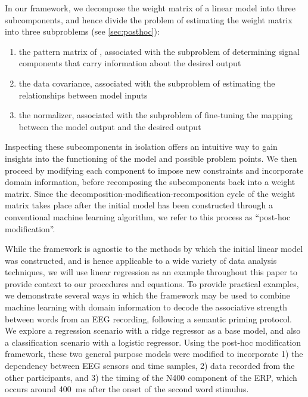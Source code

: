 \documentclass[a4paper]{vanvliet_paper}
\begin{document}
In our framework, we decompose the weight matrix of a linear model into three subcomponents, and hence divide the problem of estimating the weight matrix into three subproblems (see \autoref{sec:posthoc}):
\begin{enumerate}
    \item the pattern matrix of \textcite{Haufe2014}, associated with the subproblem of determining signal components that carry information about the desired output
    \item the data covariance, associated with the subproblem of estimating the relationships between model inputs
    \item the normalizer, associated with the subproblem of fine-tuning the mapping between the model output and the desired output
\end{enumerate}
Inspecting these subcomponents in isolation offers an intuitive way to gain insights into the functioning of the model and possible problem points.
We then proceed by modifying each component to impose new constraints and incorporate domain information, before recomposing the subcomponents back into a weight matrix.
Since the decomposition-modification-recomposition cycle of the weight matrix takes place after the initial model has been constructed through a conventional machine learning algorithm, we refer to this process as ``post-hoc modification''.

While the framework is agnostic to the methods by which the initial linear model was constructed, and is hence applicable to a wide variety of data analysis techniques, we will use linear regression as an example throughout this paper to provide context to our procedures and equations.
To provide practical examples, we demonstrate several ways in which the framework may be used to combine machine learning with domain information to decode the associative strength between words from an \gls{EEG} recording, following a semantic priming protocol\cite{Neely1991, VanVliet2014}.
We explore a regression scenario with a ridge regressor as a base model, and also a classification scenario with a logistic regressor.
Using the post-hoc modification framework, these two general purpose models were modified to incorporate 1) the dependency between \gls{EEG} sensors and time samples, 2) data recorded from the other participants, and 3) the timing of the N400 component of the \gls{ERP}, which occurs around \SI{400}{\milli\second} after the onset of the second word stimulus\cite{Kutas1980, Kutas2011}.

\end{document}
